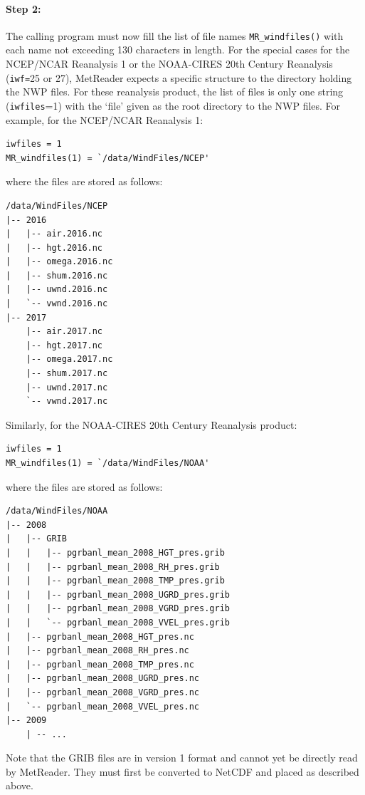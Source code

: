 \documentclass[11pt]{article}   %
\begin{document}
\paragraph{Step 2:} The calling program must now fill the list of file names \texttt{MR\_windfiles()}
with each name not exceeding 130 characters in length.  For the special cases for the NCEP/NCAR
Reanalysis 1 or the NOAA-CIRES 20th Century Reanalysis (\texttt{iwf=}25 or 27), MetReader expects
a specific structure to the directory holding the NWP files.  For these reanalysis product,
the list of files is only one string (\texttt{iwfiles}=1)
with the `file' given as the root directory to the NWP files.  For example, for the
NCEP/NCAR Reanalysis 1:
\begin{verbatim}
iwfiles = 1
MR_windfiles(1) = `/data/WindFiles/NCEP'
\end{verbatim}
where the files are stored as follows:
\begin{verbatim}
/data/WindFiles/NCEP
|-- 2016
|   |-- air.2016.nc
|   |-- hgt.2016.nc
|   |-- omega.2016.nc
|   |-- shum.2016.nc
|   |-- uwnd.2016.nc
|   `-- vwnd.2016.nc
|-- 2017
    |-- air.2017.nc
    |-- hgt.2017.nc
    |-- omega.2017.nc
    |-- shum.2017.nc
    |-- uwnd.2017.nc
    `-- vwnd.2017.nc
\end{verbatim}
Similarly, for the NOAA-CIRES 20th Century Reanalysis product:
\begin{verbatim}
iwfiles = 1
MR_windfiles(1) = `/data/WindFiles/NOAA'
\end{verbatim}
where the files are stored as follows:
\begin{verbatim}
/data/WindFiles/NOAA
|-- 2008
|   |-- GRIB
|   |   |-- pgrbanl_mean_2008_HGT_pres.grib
|   |   |-- pgrbanl_mean_2008_RH_pres.grib
|   |   |-- pgrbanl_mean_2008_TMP_pres.grib
|   |   |-- pgrbanl_mean_2008_UGRD_pres.grib
|   |   |-- pgrbanl_mean_2008_VGRD_pres.grib
|   |   `-- pgrbanl_mean_2008_VVEL_pres.grib
|   |-- pgrbanl_mean_2008_HGT_pres.nc
|   |-- pgrbanl_mean_2008_RH_pres.nc
|   |-- pgrbanl_mean_2008_TMP_pres.nc
|   |-- pgrbanl_mean_2008_UGRD_pres.nc
|   |-- pgrbanl_mean_2008_VGRD_pres.nc
|   `-- pgrbanl_mean_2008_VVEL_pres.nc
|-- 2009
    | -- ...
\end{verbatim}
Note that the GRIB files are in version 1 format and cannot yet be directly read by
MetReader.  They must first be converted to NetCDF and placed as described above.
\end{document}
